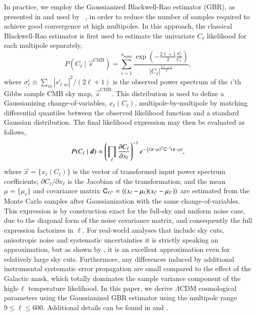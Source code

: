 \documentclass[twocolumn]{aa}
\renewcommand{\d}[0]{\vec{d}}
\newcommand{\x}[0]{\vec{x}}
\newcommand{\s}[0]{\vec{s}}
\newcommand{\Cp}[0]{\tens{C}}
\begin{document}
In practice, we employ the Gaussianized Blackwell-Rao estimator (GBR),
as presented in \citet{rudjord:2009} and used by
\Planck\ \citep{planck2016-l05}, in order to reduce the number of
samples required to achieve good convergence at high
multipoles. In this approach, the classical Blackwell-Rao estimator is
first used to estimate the univariate $C_{\ell}$ likelihood for each
multipole separately,
\begin{equation}
  P(C_{\ell}\mid\s^{\mathrm{CMB}}) =
  \sum_{i = 1}^{n_{\mathrm{samp}}} \frac{\exp({-\frac{2\ell+1}{2}\frac{\sigma^i_{\ell}}{C_{\ell}}})}{|C_{\ell}|^{\frac{2\ell+1}{2}}},
\end{equation}
where $\sigma^i_{\ell} \equiv \sum_{m} |s^i_{\ell m}|^2/(2\ell+1)$ is
the observed power spectrum of the $i$'th Gibbs sample CMB sky map,
$\s^{\mathrm{CMB}}$. This distribution is used to define a
Gaussianizing change-of-variables, $x_{\ell}(C_{\ell})$,
multipole-by-multipole by matching differential quantiles between the
observed likelihood function and a standard Gaussian distribution. The
final likelihood expression may then be evaluated as follows,
\begin{equation}
  \label{eq:GBR}
  P(C_\ell\mid\d)\approx \left(\prod_\ell\frac{\partial C_\ell}{\partial x_\ell}
  \right)^{-1} e^{-\frac{1}{2}(\x-\mu)^T\Cp^{-1}(\x-\mu)},
\end{equation}
where $\x=\lbrace x_\ell(C_{\ell})\rbrace$ is the vector of transformed
input power spectrum coefficients; $\partial C_\ell/\partial x_\ell$
is the Jacobian of the transformation; and the mean
$\mu=\lbrace\mu_\ell\rbrace$ and covariance matrix $\Cp_{\ell\ell'}=
\langle (x_\ell-\mu_\ell)(x_{\ell'}-\mu_{\ell'})\rangle$ are estimated
from the Monte Carlo samples after Gaussianization with the same
change-of-variables. This expression is by construction exact for the
full-sky and uniform noise case, due to the diagonal form of the noise
covariance matrix, and consequently the full expression factorizes in
$\ell$. For real-world analyses that include sky cuts, anisotropic noise
and systematic uncertainties it is strictly speaking an approximation,
but as shown by \citet{rudjord:2009}, it is an excellent approximation
even for relatively large sky cuts. Furthermore, any differences
induced by additional instrumental systematic error propagation are
small compared to the effect of the Galactic mask, which totally
dominates the sample variance component of the high-$\ell$ temperature
likelihood. In this paper, we derive $\Lambda$CDM cosmological
parameters using the Gaussianized GBR estimator using the multipole
range $9\le\ell\le 600$. Additional details can be found in
\citet{bp01} and \citet{bp11}.
\end{document}
